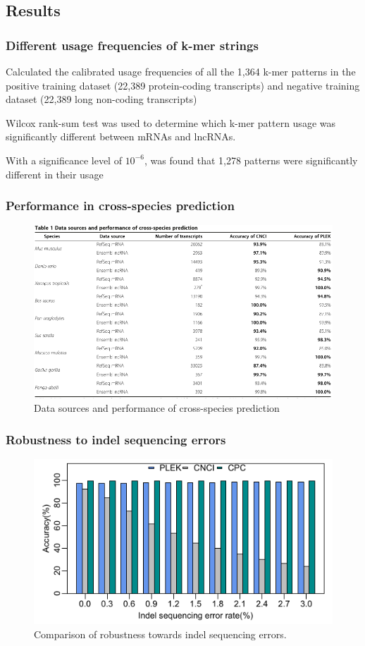 \documentclass[hyperref={pdfpagelabels=false}]{beamer}
\begin{document}
\subsection{Results}
\begin{frame}
\frametitle{Different usage frequencies of k-mer strings}
Calculated the calibrated usage frequencies of all the 1,364 k-mer patterns in the positive training dataset (22,389 protein-coding transcripts) and
negative training dataset (22,389 long non-coding transcripts) \pause

Wilcox rank-sum test was used to determine which k-mer pattern usage was significantly different between mRNAs and lncRNAs. \pause

With a significance level of $10^{-6}$, was found that 1,278 patterns were significantly different in their usage

\end{frame}

\begin{frame}
\frametitle{Performance in cross-species prediction}
\begin{figure}
	\centering
	\includegraphics[scale=0.4]{fig1}
	\caption{Data sources and performance of cross-species prediction}
	\label{fig:fig1}
\end{figure}

\end{frame}



\begin{frame}
\frametitle{Robustness to indel sequencing errors}
\begin{figure}
	\centering
	\includegraphics[scale=0.45]{fig2}
	\caption{Comparison of robustness towards indel sequencing errors.}
	\label{fig:fig2}
\end{figure}
\end{frame}
\end{document}
